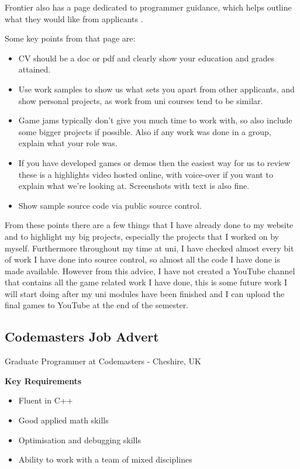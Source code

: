 \documentclass{scrartcl}
\begin{document}
 Frontier also has a page dedicated to programmer guidance, which helps outline what they would like from applicants \cite{FrontierAdvice}.

Some key points from that page are:
\begin{itemize}
	\item CV should be a doc or pdf and clearly show your education and grades attained.
	\item Use work samples to show us what sets you apart from other applicants, and show personal projects, as work from uni courses tend to be similar.
	\item Game jams typically don't give you much time to work with, so also include some bigger projects if possible. Also if any work was done in a group, explain what your role was.
	\item If you have developed games or demos then the easiest way for us to review these is a highlights video hosted online, with voice-over if you want to explain what we're looking at. Screenshots with text is also fine.
	\item Show sample source code via public source control.
\end{itemize}

From these points there are a few things that I have already done to my website and to highlight my big projects,  especially the projects that I worked on by myself.
Furthermore throughout my time at uni, I have checked almost every bit of work I have done into source control, so almost all the code I have done is made available.
However from this advice, I have not created a YouTube channel that contains all the game related work I have done, this is some future work I will start doing after my uni modules have been finished and I can upload the final games to YouTube at the end of the semester.






\subsection{Codemasters Job Advert}
Graduate Programmer at Codemasters -  Cheshire, UK \cite{JobTwo}

\textbf{Key Requirements}
\begin{itemize}
	\item Fluent in C++
	\item Good applied math skills
	\item Optimisation and debugging skills
	\item Ability to work with a team of mixed disciplines
\end{itemize}
\end{document}
